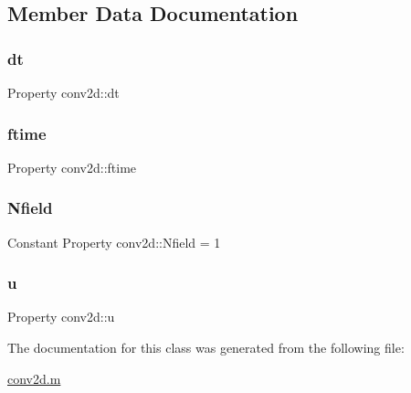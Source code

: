 \subsection{Member Data Documentation}
\mbox{\label{classconv2d_acfbd91a2c46eaceeab325f312790663b}} 
\subsubsection{\texorpdfstring{dt}{dt}}
{\footnotesize\ttfamily Property conv2d\+::dt}

\mbox{\label{classconv2d_a03569565a9fce8740e54ebba69a4d0da}} 
\subsubsection{\texorpdfstring{ftime}{ftime}}
{\footnotesize\ttfamily Property conv2d\+::ftime}

\mbox{\label{classconv2d_a66271871a00e1f96c5b2107b4619121d}} 
\subsubsection{\texorpdfstring{Nfield}{Nfield}}
{\footnotesize\ttfamily Constant Property conv2d\+::\+Nfield = 1}

\mbox{\label{classconv2d_acca7586773892ccdfd176584c44399ca}} 
\subsubsection{\texorpdfstring{u}{u}}
{\footnotesize\ttfamily Property conv2d\+::u}



The documentation for this class was generated from the following file\+:\begin{DoxyCompactItemize}
\item 
\hyperlink{conv2d_8m}{conv2d.\+m}\end{DoxyCompactItemize}

